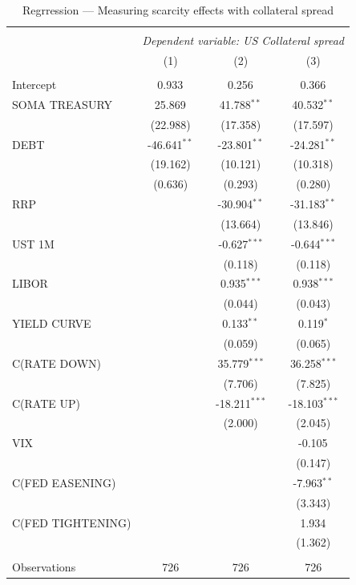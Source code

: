 \documentclass[11pt,a4paper,english,oneside]{article}
\begin{document}
\begin{table}[!htbp] \centering
\caption{Regrression --- Measuring scarcity effects with collateral spread}
\begin{tabular}{@{\extracolsep{5pt}}lccc}
\\[-1.8ex]\hline
\hline \\[-1.8ex]
& \multicolumn{3}{c}{\textit{Dependent variable: US Collateral spread}} \
\cr \cline{3-4}
\\[-1.8ex] & (1) & (2) & (3) \\
\hline \\[-1.8ex]
 Intercept & 0.933$^{}$ & 0.256$^{}$ & 0.366$^{}$ \\
 SOMA TREASURY & 25.869$^{}$ & 41.788$^{**}$ & 40.532$^{**}$ \\
  & (22.988) & (17.358) & (17.597) \\
 DEBT & -46.641$^{**}$ & -23.801$^{**}$ & -24.281$^{**}$ \\
  & (19.162) & (10.121) & (10.318) \\
  & (0.636) & (0.293) & (0.280) \\
 RRP & & -30.904$^{**}$ & -31.183$^{**}$ \\
  & & (13.664) & (13.846) \\
 UST 1M & & -0.627$^{***}$ & -0.644$^{***}$ \\
  & & (0.118) & (0.118) \\
 LIBOR & & 0.935$^{***}$ & 0.938$^{***}$ \\
  & & (0.044) & (0.043) \\
 YIELD CURVE & & 0.133$^{**}$ & 0.119$^{*}$ \\
  & & (0.059) & (0.065) \\
 C(RATE DOWN) & & 35.779$^{***}$ & 36.258$^{***}$ \\
  & & (7.706) & (7.825) \\
 C(RATE UP) & & -18.211$^{***}$ & -18.103$^{***}$ \\
  & & (2.000) & (2.045) \\
 VIX & & & -0.105$^{}$ \\
  & & & (0.147) \\
 C(FED EASENING) & & & -7.963$^{**}$ \\
  & & & (3.343) \\
 C(FED TIGHTENING) & & & 1.934$^{}$ \\
  & & & (1.362) \\
\hline \\[-1.8ex]
 Observations & 726 & 726 & 726 \\

\end{tabular}
\end{table}
\end{document}
